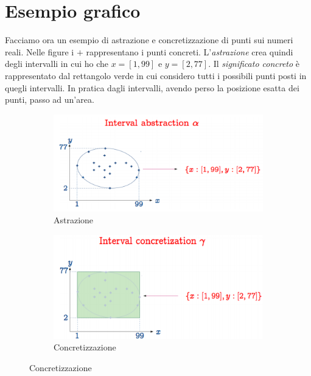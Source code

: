 \documentclass[a4paper,oneside,titlepage]{book}
\begin{document}
\section{Esempio grafico} %
Facciamo ora un esempio di astrazione e concretizzazione di punti sui numeri reali. Nelle figure i $+$ rappresentano i punti concreti. L'\textit{astrazione} crea quindi degli intervalli in cui ho che $x = [1,99]$ e $y = [2,77]$. Il \textit{significato concreto} è rappresentato dal rettangolo verde in cui considero tutti i possibili punti posti in quegli intervalli. In pratica dagli intervalli, avendo perso la posizione esatta dei punti, passo ad un'area.
\begin{figure}[htp]
	\begin{subfigure}{0.49\textwidth}
	    \centering
		\includegraphics[width=\textwidth, height=\textheight, keepaspectratio]{esAstr.png}
		\caption{Astrazione}
	\end{subfigure}
	\hfill
	\begin{subfigure}{0.49\textwidth}
	    \centering
		\includegraphics[width=\textwidth, height=\textheight, keepaspectratio]{esConcr.png} 
		\caption{Concretizzazione}
	\end{subfigure}
\end{figure}
\end{document}

